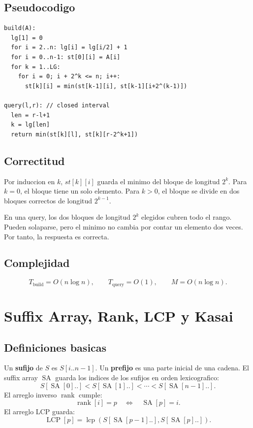 \documentclass[10pt]{article}
\newcommand{\bigO}{O}
\newcommand{\SA}{\operatorname{SA}}
\newcommand{\LCP}{\operatorname{LCP}}
\newcommand{\rankv}{\operatorname{rank}}
\begin{document}
\subsection{Pseudocodigo}
\begin{lstlisting}
build(A):
  lg[1] = 0
  for i = 2..n: lg[i] = lg[i/2] + 1
  for i = 0..n-1: st[0][i] = A[i]
  for k = 1..LG:
    for i = 0; i + 2^k <= n; i++:
      st[k][i] = min(st[k-1][i], st[k-1][i+2^(k-1)])

query(l,r): // closed interval
  len = r-l+1
  k = lg[len]
  return min(st[k][l], st[k][r-2^k+1])
\end{lstlisting}

\subsection{Correctitud}
Por induccion en \(k\), \(st[k][i]\) guarda el minimo del bloque de longitud \(2^k\). Para \(k=0\), el bloque
tiene un solo elemento. Para \(k>0\), el bloque se divide en dos bloques correctos de longitud \(2^{k-1}\).

En una query, los dos bloques de longitud \(2^k\) elegidos cubren todo el rango. Pueden solaparse, pero el minimo
no cambia por contar un elemento dos veces. Por tanto, la respuesta es correcta.

\subsection{Complejidad}
\[
T_{\text{build}}=\bigO(n\log n),\qquad T_{\text{query}}=\bigO(1),\qquad M=\bigO(n\log n).
\]

\newpage

\section{Suffix Array, Rank, LCP y Kasai}

\subsection{Definiciones basicas}
Un \textbf{sufijo} de \(S\) es \(S[i..n-1]\). Un \textbf{prefijo} es una parte inicial de una cadena.
El suffix array \(\SA\) guarda los indices de los sufijos en orden lexicografico:
\[
S[\SA[0]..] < S[\SA[1]..] < \cdots < S[\SA[n-1]..].
\]
El arreglo inverso \(\rankv\) cumple:
\[
\rankv[i]=p \quad \Longleftrightarrow \quad \SA[p]=i.
\]
El arreglo LCP guarda:
\[
\LCP[p]=\operatorname{lcp}(S[\SA[p-1]..],S[\SA[p]..]).
\]
\end{document}
